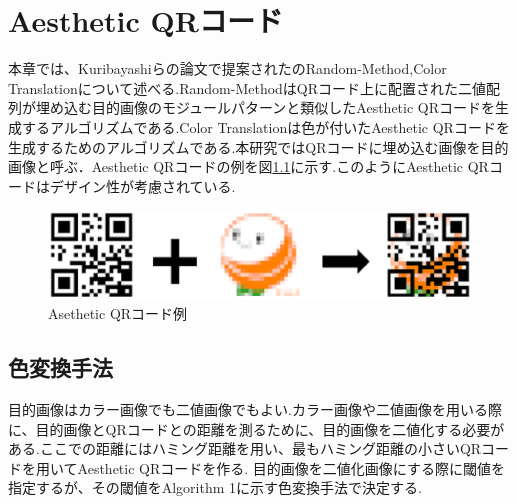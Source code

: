\documentclass{thesis}
\begin{document}

\chapter{Aesthetic QRコード}
\label{chap:3}


本章では、Kuribayashiらの論文で提案された\cite{KURI}のRandom-Method,Color Translationについて述べる.Random-MethodはQRコード上に配置された二値配列が埋め込む目的画像のモジュールパターンと類似したAesthetic QRコードを生成するアルゴリズムである.Color Translationは色が付いたAesthetic QRコードを生成するためのアルゴリズムである.本研究ではQRコードに埋め込む画像を目的画像と呼ぶ．Aesthetic QRコードの例を図\ref{As}に示す.このようにAesthetic QRコードはデザイン性が考慮されている.

\begin{figure}[H]
      \centering
      \includegraphics[width=0.7\linewidth]{pic/As.eps}
      \caption{Asethetic QRコード例}
      \label{As}
\end{figure}



\section{色変換手法}


目的画像はカラー画像でも二値画像でもよい.カラー画像や二値画像を用いる際に、目的画像とQRコードとの距離を測るために、目的画像を二値化する必要がある.ここでの距離にはハミング距離を用い、最もハミング距離の小さいQRコードを用いてAesthetic QRコードを作る.
目的画像を二値化画像にする際に閾値を指定するが、その閾値をAlgorithm 1に示す色変換手法で決定する.
\end{document}
